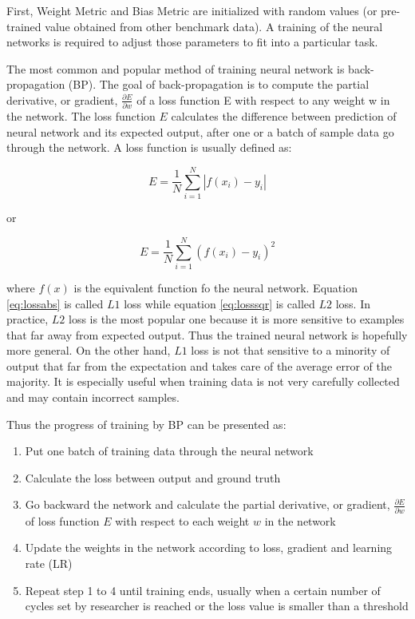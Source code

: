 First, Weight Metric and Bias Metric are initialized with random values (or pre-trained value obtained from other benchmark data). A training of the neural networks is required to adjust those parameters to fit into a particular task.

The most common and popular method of training neural network is back-propagation (BP). The goal of back-propagation is to compute the partial derivative, or gradient, $\frac{\partial E}{\partial w}$ of a loss function E with respect to any weight w in the network. The loss function
$E$ calculates the difference between prediction of neural network and its expected output, after one or a batch of sample data go through the network. A loss function is usually defined as:

\begin{equation} \label{eq:lossabs}
E=\frac{1}{N}\sum_{i=1}^{N}|f(x_i)-y_i| 
\end{equation}

or

\begin{equation} \label{eq:losssqr}
E=\frac{1}{N}\sum_{i=1}^{N}(f(x_i)-y_i)^{2} 
\end{equation}

where $f(x)$ is the equivalent function fo the neural network. Equation \ref{eq:lossabs} is called $L1$ loss while equation \ref{eq:losssqr} is called $L2$ loss. In practice, $L2$ loss is the most popular one because it is more sensitive to examples that far away from expected output. Thus
the trained neural network is hopefully more general. On the other hand, $L1$ loss is not
that sensitive to a minority of output that far from the expectation and takes care of the
average error of the majority. It is especially useful when training data is not very carefully
collected and may contain incorrect samples.

Thus the progress of training by BP can be presented as:

\begin{enumerate}
  \item Put one batch of training data through the neural network
  \item Calculate the loss between output and ground truth
  \item Go backward the network and calculate the partial derivative, or gradient, $\frac{\partial E}{\partial w}$
of loss function $E$ with respect to each weight $w$ in the network
  \item Update the weights in the network according to loss, gradient and learning rate (LR)
  \item Repeat step 1 to 4 until training ends, usually when a certain number of cycles set
by researcher is reached or the loss value is smaller than a threshold
\end{enumerate}

